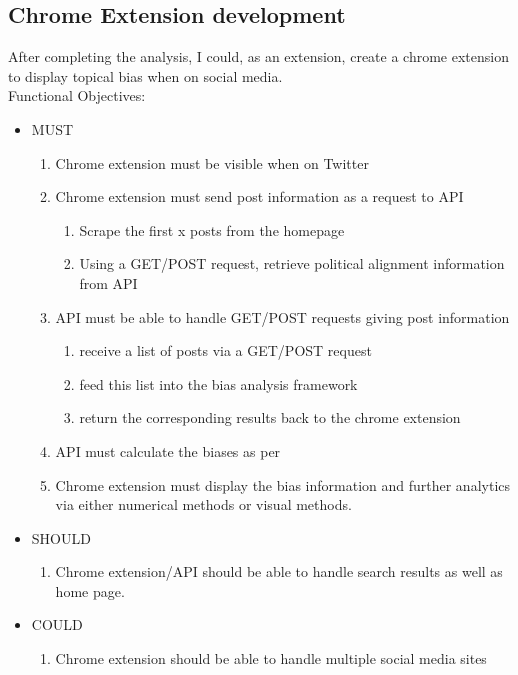 \documentclass[a4paper,fleqn,10pt]{article}
\begin{document}
\subsection{Chrome Extension development}
After completing the analysis, I could, as an extension, create a chrome extension to display topical bias when on social media.
\\
Functional Objectives:
\begin{itemize}
    \item MUST
    \begin{enumerate}
        \item Chrome extension must be visible when on Twitter
        \item Chrome extension must send post information as a request to API 
        \begin{enumerate}
            \item Scrape the first x posts from the homepage
            \item Using a GET/POST request, retrieve political alignment information from API
        \end{enumerate}
        \item API must be able to handle GET/POST requests giving post information
        \begin{enumerate}
            \item receive a list of posts via a GET/POST request
            \item feed this list into the bias analysis framework
            \item return the corresponding results back to the chrome extension
        \end{enumerate}
        \item API must calculate the biases as per 
        \item Chrome extension must display the bias information and further analytics via either numerical methods or visual methods.
    \end{enumerate}
    \item SHOULD
    \begin{enumerate}
        \item Chrome extension/API should be able to handle search results as well as home page.
    \end{enumerate}
    \item COULD
    \begin{enumerate}
        \item Chrome extension should be able to handle multiple social media sites
    \end{enumerate}
\end{itemize}
\end{document}
